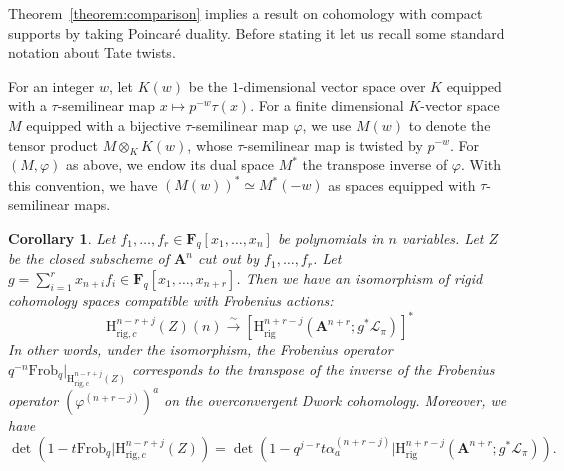 \documentclass{amsart}
\numberwithin{equation}{section}
\theoremstyle{plain}
\newtheorem{corollary}[equation]{Corollary}
\theoremstyle{definition}
\renewcommand{\mathbb}{\mathbf}
\begin{document}
Theorem~\ref{theorem:comparison} implies a result on cohomology with compact supports
by taking Poincaré duality.  Before stating it let us recall some
standard notation about Tate twists.

For an integer \(w\), let \(K(w)\) be the \(1\)-dimensional vector
space over \(K\) equipped with a \(\tau\)-semilinear map
\(x\mapsto p^{-w}\tau(x)\).  For a finite dimensional \(K\)-vector
space \(M\) equipped with a bijective \(\tau\)-semilinear map
\(\varphi\), we use \(M(w)\) to denote the tensor product
\(M\otimes_{K}K(w)\), whose \(\tau\)-semilinear map is twisted by
\(p^{-w}\).  For \((M,\varphi)\) as above, we endow its dual space
\(M^{\ast}\) the transpose inverse of \(\varphi\).  With this
convention, we have \((M(w))^{\ast}\simeq M^{\ast}(-w)\) as spaces
equipped with \(\tau\)-semilinear maps.


\begin{corollary}%
\label{corollary:compact-support-frobenius}
Let \(f_{1},\ldots,f_{r} \in \mathbb{F}_{q}[x_{1},\ldots,x_{n}]\) be polynomials in \(n\) variables.
Let \(Z\)
be the closed subscheme of \(\mathbb{A}^{n}\) cut out by \(f_{1},\ldots,f_{r}\).
Let \(g = \sum_{i=1}^{r}x_{n+i}f_{i} \in \mathbb{F}_{q}[x_{1},\ldots,x_{n+r}]\).
Then we  have an isomorphism of rigid cohomology spaces compatible with
Frobenius actions:
\begin{equation*}
\mathrm{H}^{n-r+j}_{\mathrm{rig},c}(Z)(n) \xrightarrow{\sim} [\mathrm{H}^{n+r-j}_{\mathrm{rig}}(\mathbb{A}^{n+r};g^{\ast}\mathcal{L}_{\pi})]^{\ast}
\end{equation*}
In other words, under the isomorphism, the Frobenius operator
\(q^{-n}\mathrm{Frob}_{q}|_{\mathrm{H}^{n-r+j}_{\mathrm{rig},c}(Z)}\)
corresponds to the transpose of the inverse of the Frobenius operator
\((\varphi^{(n+r-j)})^{a}\) on the overconvergent Dwork cohomology.
Moreover, we have
\begin{equation*}
\det(1 - t\mathrm{Frob}_{q}|\mathrm{H}^{n-r+j}_{\mathrm{rig},c}(Z))
= \det(1 -  q^{j-r}t\alpha^{(n+r-j)}_{a}| \mathrm{H}_{\mathrm{rig}}^{n+r-j}(\mathbb{A}^{n+r};g^{\ast}\mathcal{L}_{\pi})).
\end{equation*}
\end{corollary}
\end{document}
